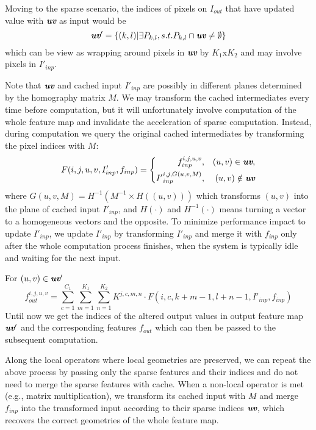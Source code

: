 Moving to the sparse scenario, 
the indices of pixels on $I_{out}$ that have updated value with \textit{\textbf{uv}} as input would be 
\begin{equation}
\textit{\textbf{uv}}' = \{(k,l)|\exists P_{k,l}, s.t. P_{k,l}\cap \textit{\textbf{uv}} \neq \emptyset\}
\end{equation} 
which can be view as wrapping around pixels in \textit{\textbf{uv}} by $K_1$x$K_2$ and may involve pixels in $I'_{inp}$.

Note that $\textit{\textbf{uv}}$ and cached input $I'_{inp}$ are possibly in different planes determined by the homography matrix $M$.
We may transform the cached intermediates every time before computation, but it will unfortunately involve computation of the whole feature map and invalidate the acceleration of sparse computation.
Instead, during computation we query the original cached intermediates by transforming the pixel indices with $M$:
\begin{equation}
    F(i,j,u,v, I'_{inp}, f_{inp}) = \left\{
        \begin{aligned}
            f_{inp}^{i,j,u,v}  & , & (u,v) \in \textit{\textbf{uv}}, \\
            {I'}_{inp}^{i,j,G(u,v,M)} &, & (u,v) \notin \textit{\textbf{uv}}
        \end{aligned}
        \right. 
    \label{eq:query}
\end{equation}
where $G(u,v,M) = H^{-1}(M^{-1}\times H((u,v)))$ which transforms $(u,v)$ into the plane of cached input $I'_{inp}$, and $H(\cdot)$ and $H^{-1}(\cdot)$ means turning a vector to a homogeneous vectors and the opposite.
To minimize performance impact to update $I'_{inp}$, we update $I'_{inp}$ by transforming $I'_{inp}$ and merge it with $f_{inp}$ only after the whole computation process finishes, when the system is typically idle and waiting for the next input.

For $(u,v)\in\textit{\textbf{uv}}'$
\begin{equation}
    f_{out}^{i,j,u,v} = \sum_{c=1}^{C_1} \sum_{m=1}^{K_1} \sum_{n=1}^{K_2} K^{j,c,m,n}\cdot F(i,c,k+m-1,l+n-1, I'_{inp}, f_{inp})
\end{equation}
Until now we get the indices of the altered output values in output feature map $\textit{\textbf{uv}}'$ and the corresponding features $f_{out}$ which can then be passed to the subsequent computation.

Along the local operators where local geometries are preserved, we can repeat the above process by passing only the sparse features and their indices and do not need to merge the sparse features with cache.
When a non-local operator is met (e.g., matrix multiplication), we transform its cached input with $M$ and merge $f_{inp}$ into the transformed input according to their sparse indices $\textit{\textbf{uv}}$, which recovers the correct geometries of the whole feature map.

